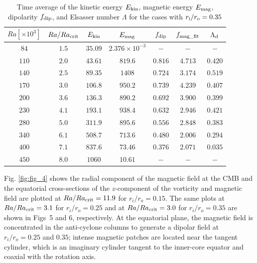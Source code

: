  \begin{table}
\caption{Time average of the kinetic energy $E_{\rm kin}$, magnetic energy $E_{\rm mag}$, dipolarity $f_{\rm dip}$, and Elsasser number $\Lambda$ for the cases with $r_{\rm i}/r_{\rm o} = 0.35$}
  \begin{tabular}{ccccccc}
    \hline
     $Ra[\times 10^3]$  &  $Ra/Ra_{\rm crit}$&  $E_{\rm kin}$  &  $E_{\rm mag}$ & $f_{\rm dip}$ & $f_{\rm mag\_fit}$ & $\Lambda_{\rm d}$\\
    \hline \hline
      $84$    & $1.5$ &  $35.09$ & $2.376 \times 10^{-3}$ & $-$ & $-$ & $-$\\
     $110$  & $2.0$ &  $43.61$ & $819.6$ & $0.816$ & $4.713$ & $0.420$\\
     $140$  & $2.5$ &  $89.35$ & $1408$ & $0.724$ & $3.174$ & $0.519$\\
     $170$  & $3.0$ &  $106.8$ & $950.2$ & $0.739$ & $4.239$ & $0.407$\\
     $200$  & $3.6$ &  $136.3$ & $890.2$ & $0.692$ & $3.900$ & $0.399$\\
     $230$  & $4.1$ &  $193.1$ & $938.4$ & $0.632$ & $2.946$ & $0.421$\\
     $280$  & $5.0$ &  $311.9$ & $895.6$ & $0.556$ & $2.848$ & $0.383$\\
     $340$  & $6.1$ &  $508.7$ & $713.6$ & $0.480$ & $2.006$ & $0.294$\\
     $400$  & $7.1$ &  $837.6$ & $73.46$ & $0.376$ & $2.071$ & $0.035$\\
     $450$  & $8.0$ &  $1060$ & $10.61$ & $-$ & $-$ & $-$\\
    \hline
  \end{tabular}
\label{table:Summary_35}
 \end{table}
%
Fig. \ref{fig:fig_4} shows the radial component of the magnetic field at the CMB and the equatorial cross-sections of the $z$-component of the vorticity and magnetic field are plotted at $Ra/Ra_{\rm crit} = 11.9$ for $r_i/r_o = 0.15$. 
The same plots at $Ra/Ra_{\rm crit} = 3.1$ for $r_i/r_o = 0.25$ and at $Ra/Ra_{\rm crit} = 3.0$ for $r_i/r_o = 0.35$ are shown in Figs~5 and 6, respectively. 
At the equatorial plane, the magnetic field is concentrated in the anti-cyclone columns to generate a dipolar field at $r_i/r_o = 0.25$ and $0.35$; intense magnetic patches are located near the tangent cylinder, which is an imaginary cylinder tangent to the inner-core equator and coaxial with the rotation axis. 
